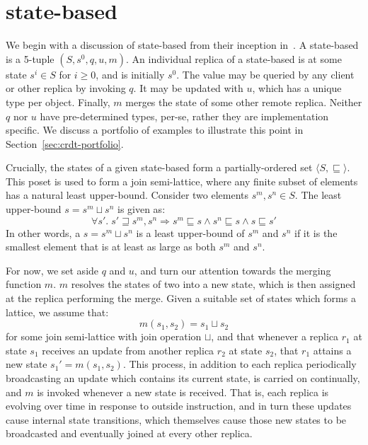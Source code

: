 \section{state-based \CRDTs}
\label{sec:state-based-crdts}
We begin with a discussion of state-based \CRDTs from their inception
in~\citep{shapiro11}. A state-based \CRDT is a 5-tuple $(S, s^0, q, u, m)$. An
individual replica of a state-based \CRDT is at some state $s^i \in S$ for $i \ge
0$, and is initially $s^0$. The value may be queried by any client or other
replica by invoking $q$. It may be updated with $u$, which has a unique type per
\CRDT object. Finally, $m$ merges the state of some other remote replica.
Neither $q$ nor $u$ have pre-determined types, per-se, rather they are
implementation specific. We discuss a portfolio of examples to illustrate this
point in Section~\ref{sec:crdt-portfolio}.

Crucially, the states of a given state-based \CRDT form a partially-ordered set
$\langle S, \sqsubseteq \rangle$. This poset is used to form a join
semi-lattice, where any finite subset of elements has a natural least
upper-bound. Consider two elements $s^m, s^n \in S$. The least upper-bound
$s = s^m \sqcup s^n$ is given as:
\[
  \forall s'.\; s' \sqsupseteq s^m, s^n \Rightarrow
    s^m \sqsubseteq s \land
    s^n \sqsubseteq s \land
    s \sqsubseteq s'
\]
In other words, a $s = s^m \sqcup s^n$ is a least upper-bound of $s^m$ and $s^n$
if it is the smallest element that is at least as large as both $s^m$ and $s^n$.

For now, we set aside $q$ and $u$, and turn our attention towards the merging
function $m$. $m$ resolves the states of two \CRDTs into a new state, which is
then assigned at the replica performing the merge. Given a suitable set of
states which forms a lattice, we assume that:
\[
  m(s_1, s_2) = s_1 \sqcup s_2
\]
for some join semi-lattice with join operation $\sqcup$, and that whenever a
\CRDT replica $r_1$ at state $s_1$ receives an update from another replica
$r_2$ at state $s_2$, that $r_1$ attains a new state $s_1' = m(s_1, s_2)$.
This process, in addition to each replica periodically broadcasting an update
which contains its current state, is carried on continually, and $m$ is
invoked whenever a new state is received. That is, each replica is evolving
over time in response to outside instruction, and in turn these updates cause
internal state transitions, which themselves cause those new states to be
broadcasted and eventually joined at every other replica.


